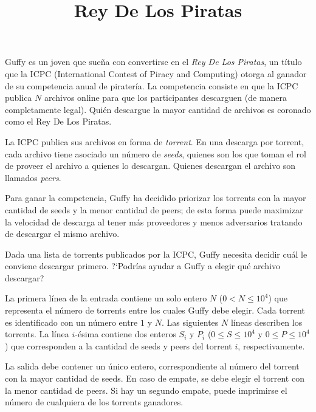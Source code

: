\documentclass{oci}
\title{Rey De Los Piratas}
\begin{document}
\begin{problemDescription}
    Guffy es un joven que sueña con convertirse en el \emph{Rey De Los Piratas}, un título que la ICPC
    (International Contest of Piracy and Computing) otorga al ganador de su competencia anual de
    piratería.
    La competencia consiste en que la ICPC publica $N$ archivos online para que los participantes
    descarguen (de manera completamente legal).
    Quién descargue la mayor cantidad de archivos es coronado como el Rey De Los Piratas.

    La ICPC publica sus archivos en forma de \emph{torrent}.
    En una descarga por torrent, cada archivo tiene asociado un número de \emph{seeds}, quienes
    son los que toman el rol de proveer el archivo a quienes lo descargan.
    Quienes descargan el archivo son llamados \emph{peers}.

    Para ganar la competencia, Guffy ha decidido priorizar los torrents con la mayor cantidad
    de seeds y la menor cantidad de peers; de esta forma puede maximizar la velocidad de descarga al tener más proveedores y menos
    adversarios tratando de descargar el mismo archivo.

    Dada una lista de torrents publicados por la ICPC, Guffy necesita decidir cuál le conviene descargar primero.
    ?`Podrías ayudar a Guffy a elegir qué archivo descargar?
\end{problemDescription}

\begin{inputDescription}
    La primera línea de la entrada contiene un solo entero $N$ ($0 < N \leq 10^4$)
    que representa el número de torrents entre los cuales Guffy debe elegir.
    Cada torrent es identificado con un número entre $1$ y $N$.
    Las siguientes $N$ líneas describen los torrents.
    La línea $i$-ésima contiene dos enteros $S_i$ y $P_i$ ($0 \leq S \leq 10^4$ y $0 \leq P \leq 10^4$)
    que corresponden a la cantidad de seeds y peers del torrent $i$, respectivamente.
\end{inputDescription}

\begin{outputDescription}
    La salida debe contener un único entero, correspondiente al número
    del torrent con la mayor cantidad de seeds.
    En caso de empate, se debe elegir el torrent con la menor cantidad de peers.
    Si hay un segundo empate, puede imprimirse el número de cualquiera de los torrents ganadores.
\end{outputDescription}
\end{document}
